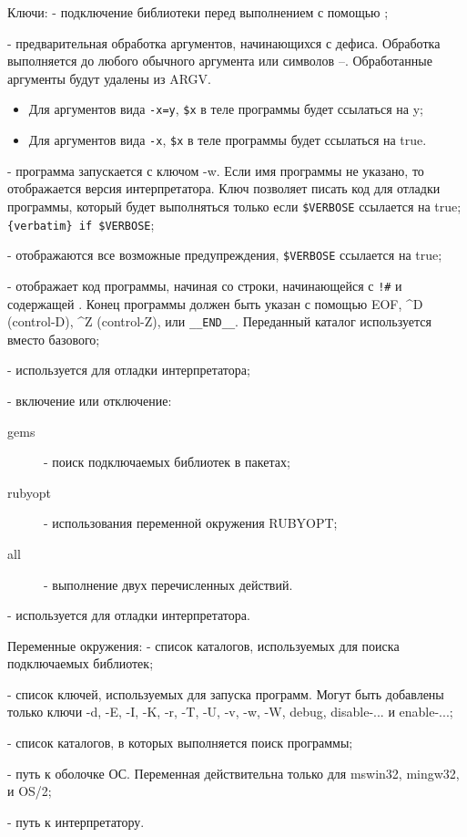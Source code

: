 \begin{keylist}{Ключи:}
   - подключение библиотеки перед выполнением с помощью ;

   - предварительная обработка аргументов, начинающихся с дефиса. Обработка выполняется до любого обычного аргумента или символов --. Обработанные аргументы будут удалены из ARGV.
  \begin{itemize}
    \item Для аргументов вида \verb!-x=y!, \verb!$x! в теле программы будет ссылаться на y;
    \item Для аргументов вида \verb!-x!, \verb!$x! в теле программы будет ссылаться на true.
  \end{itemize}    
  
   - программа запускается с ключом -w. Если имя программы не указано, то отображается версия интерпретатора. Ключ позволяет писать код для отладки программы, который будет выполняться только если \verb!$VERBOSE! ссылается на true;
  \\\verb!{verbatim} if $VERBOSE!; 

   - отображаются все возможные предупреждения, \verb!$VERBOSE! ссылается на true;

   - отображает код программы, начиная со строки, начинающейся с \verb/!#/ и содержащей . Конец программы должен быть указан с помощью EOF, \textasciicircum D (control-D), \textasciicircum Z (control-Z), или \verb!__END__!. Переданный каталог используется вместо базового;

   - используется для отладки интерпретатора;

   - включение или отключение:  
  \begin{description}
    \item[gems] - поиск подключаемых библиотек в пакетах;
    \item[rubyopt] - использования переменной окружения RUBYOPT;
    \item[all] - выполнение двух перечисленных действий.
  \end{description}
  
   - используется для отладки интерпретатора.
\end{keylist}

\begin{keylist}{Переменные окружения:}
   - список каталогов, используемых для поиска подключаемых библиотек; 

   - список ключей, используемых для запуска программ. Могут быть добавлены только ключи -d, -E, -I, -K, -r, -T, -U, -v, -w, -W, \twominus debug, \twominus disable-... и \twominus enable-...; 

   - список каталогов, в которых выполняется поиск программы; 
  
   - путь к оболочке ОС. Переменная действительна только для mswin32, mingw32, и OS/2; 
  
   - путь к интерпретатору.
\end{keylist}

